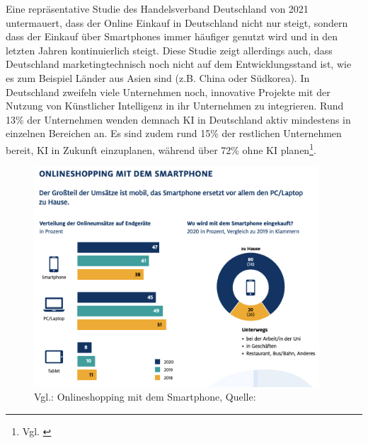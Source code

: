 Eine repräsentative Studie des Handelsverband Deutschland von 2021 untermauert, dass der Online Einkauf in Deutschland nicht nur steigt, sondern dass der Einkauf über Smartphones immer häufiger genutzt wird und in den letzten Jahren kontinuierlich steigt. Diese Studie zeigt allerdings auch, dass Deutschland marketingtechnisch noch nicht auf dem Entwicklungsstand ist, wie es zum Beispiel Länder aus Asien sind (z.B. China oder Südkorea). In Deutschland zweifeln viele Unternehmen noch, innovative Projekte mit der Nutzung von Künstlicher Intelligenz in ihr Unternehmen zu integrieren. Rund 13\% der Unternehmen wenden demnach KI in Deutschland aktiv mindestens in einzelnen Bereichen an. Es sind zudem rund 15\% der restlichen Unternehmen bereit, KI in Zukunft einzuplanen, während über 72\% ohne KI planen\footnote{Vgl. \autocite [Online] {Handelsverband2021}}.
\begin{figure}[!ht]
    \centering
    \includegraphics[width=0.95\textwidth,angle=0]{src/abbildungen/Shopping_smartphone.png}
    \caption[Quelle: HDE Deutschland Handelsverband - Marktentwicklung im Online-Handel, 2021]{Vgl.: Onlineshopping mit dem Smartphone, Quelle: \autocite {Handelsverband2021}}
   \label{Onlineshopping_smartphone}
   \end{figure}


